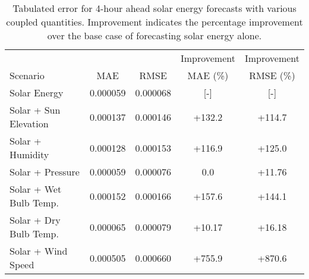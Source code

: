   \begin{table*}[b]
    \centering
    \caption{Tabulated error for 4-hour ahead solar energy forecasts with various coupled quantities. Improvement indicates the percentage improvement over the base case of forecasting solar energy alone.}
    \label{tab:solar04}
    \begin{tabular}{l|c|c|c|c}
      &  & & Improvement & Improvement \\
      Scenario  & MAE & RMSE & MAE (\%) & RMSE (\%)\\
      \hline
      Solar Energy & 0.000059 & 0.000068 & [-] & [-] \\
      Solar + Sun Elevation & 0.000137 & 0.000146 &  +132.2& +114.7\\
      Solar + Humidity & 0.000128 & 0.000153 & +116.9& +125.0\\
      Solar + Pressure & 0.000059 & 0.000076 & 0.0& +11.76\\
      Solar + Wet Bulb Temp. & 0.000152 & 0.000166 & +157.6& +144.1\\
      Solar + Dry Bulb Temp. & 0.000065 & 0.000079 & +10.17& +16.18\\
      Solar + Wind Speed & 0.000505 & 0.000660 & +755.9& +870.6\\
    \end{tabular}
  \end{table*}
